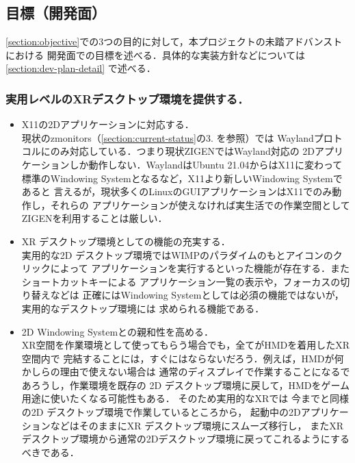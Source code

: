 \subsection{目標（開発面）}
\label{section:dev-goal}

\ref*{section:objective}での3つの目的に対して，本プロジェクトの未踏アドバンストにおける
開発面での目標を述べる．具体的な実装方針などについては\ref{section:dev-plan-detail}
で述べる．

\subsubsection*{実用レベルのXRデスクトップ環境を提供する．}

\begin{itemize}
  \item X11の2Dアプリケーションに対応する．\\
        現状のzmonitors（\ref{section:current-status}の3. を参照）では %
        Waylandプロトコルにのみ対応している．つまり現状ZIGENではWayland対応の
        2Dアプリケーションしか動作しない．WaylandはUbuntu 21.04からはX11に変わって
        標準のWindowing Systemとなるなど，X11より新しいWindowing Systemであると
        言えるが，現状多くのLinuxのGUIアプリケーションはX11でのみ動作し，それらの
        アプリケーションが使えなければ実生活での作業空間としてZIGENを利用することは厳しい．

  \item XR デスクトップ環境としての機能の充実する．\\
        実用的な2D デスクトップ環境ではWIMPのパラダイムのもとアイコンのクリックによって
        アプリケーションを実行するといった機能が存在する．またショートカットキーによる
        アプリケーション一覧の表示や，フォーカスの切り替えなどは
        正確にはWindowing Systemとしては必須の機能ではないが，実用的なデスクトップ環境には
        求められる機能である．

  \item 2D Windowing Systemとの親和性を高める．\\
        XR空間を作業環境として使ってもらう場合でも，全てがHMDを着用したXR空間内で
        完結することには，すぐにはならないだろう．例えば，HMDが何かしらの理由で使えない場合は
        通常のディスプレイで作業することになるであろうし，作業環境を既存の
        2D デスクトップ環境に戻して，HMDをゲーム用途に使いたくなる可能性もある．
        そのため実用的なXRでは 今までと同様の2D デスクトップ環境で作業しているところから，
        起動中の2DアプリケーションなどはそのままにXR デスクトップ環境にスムーズ移行し，
        またXRデスクトップ環境から通常の2Dデスクトップ環境に戻ってこれるようにするべきである．
\end{itemize}

